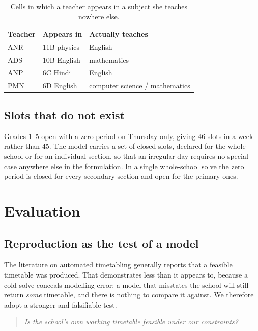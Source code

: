 \begin{table}[ht]
\centering
\caption{Cells in which a teacher appears in a subject she teaches nowhere else.}
\label{tab:wrongrow}
\begin{tabular}{lll}
\toprule
Teacher & Appears in & Actually teaches \\
\midrule
ANR & 11B physics  & English \\
ADS & 10B English  & mathematics \\
ANP & 6C Hindi     & English \\
PMN & 6D English   & computer science / mathematics \\
\bottomrule
\end{tabular}
\end{table}

\subsection{Slots that do not exist}

Grades 1--5 open with a zero period on Thursday only, giving 46 slots in a week rather than 45.
The model carries a set of closed slots, declared for the whole school or for an individual
section, so that an irregular day requires no special case anywhere else in the formulation. In a
single whole-school solve the zero period is closed for every secondary section and open for the
primary ones.


\section{Evaluation}
\label{sec:evaluation}

\subsection{Reproduction as the test of a model}

The literature on automated timetabling generally reports that a feasible timetable was produced.
That demonstrates less than it appears to, because a cold solve conceals modelling error: a model
that misstates the school will still return \emph{some} timetable, and there is nothing to compare
it against. We therefore adopt a stronger and falsifiable test.

\begin{quote}
\emph{Is the school's own working timetable feasible under our constraints?}
\end{quote}

